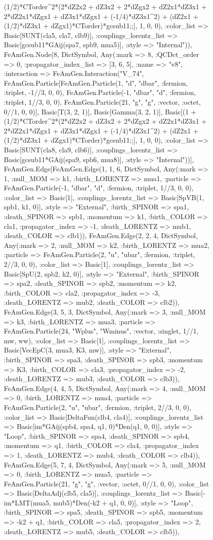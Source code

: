 \documentclass{revtex4}
\begin{document}
\begin{figure}[!htb]
\begin{center}
{(1/2)*CTorder^2*(2*dZ2x2 + dZ3x2 + 2*dZgx2 + dZ2x1*dZ3x1 + 2*dZ2x1*dZgx1 + dZ3x1*dZgx1 + (-1/4)*dZ3x1^2) + (dZ2x1 + (1/2)*dZ3x1 + dZgx1)*CTorder)*gcsub11;;], 1, 0, 0), :color_list => Basic[SUNT(cla5, cla7, clb9)], :couplings_lorentz_list => Basic[gcsub11*GAij(spa7, spb9, mua5)], :style => "Internal")), FeAmGen.Node(8, Dict{Symbol, Any}(:mark => 8, :QCDct_order => 0, :propagator_index_list => [3, 6, 5], :name => "v8", :interaction => FeAmGen.Interaction("V_74", FeAmGen.Particle[FeAmGen.Particle(1, "d", "dbar", :fermion, :triplet, -1//3, 0, 0), FeAmGen.Particle(-1, "dbar", "d", :fermion, :triplet, 1//3, 0, 0), FeAmGen.Particle(21, "g", "g", :vector, :octet, 0//1, 0, 0)], Basic[T(3, 2, 1)], Basic[Gamma(3, 2, 1)], Basic[(1 + (1/2)*CTorder^2*(2*dZ2x2 + dZ3x2 + 2*dZgx2 + dZ2x1*dZ3x1 + 2*dZ2x1*dZgx1 + dZ3x1*dZgx1 + (-1/4)*dZ3x1^2) + (dZ2x1 + (1/2)*dZ3x1 + dZgx1)*CTorder)*gcsub11;;], 1, 0, 0), :color_list => Basic[SUNT(cla8, cla9, clb6)], :couplings_lorentz_list => Basic[gcsub11*GAij(spa9, spb6, mua8)], :style => "Internal"))], FeAmGen.Edge[FeAmGen.Edge(1, 1, 6, Dict{Symbol, Any}(:mark => 1, :null_MOM => k1, :birth_LORENTZ => mua1, :particle => FeAmGen.Particle(-1, "dbar", "d", :fermion, :triplet, 1//3, 0, 0), :color_list => Basic[1], :couplings_lorentz_list => Basic[SpVB(1, spb1, k1, 0)], :style => "External", :birth_SPINOR => spa1, :death_SPINOR => spb1, :momentum => k1, :birth_COLOR => cla1, :propagator_index => -1, :death_LORENTZ => mub1, :death_COLOR => clb1)), FeAmGen.Edge(2, 2, 4, Dict{Symbol, Any}(:mark => 2, :null_MOM => k2, :birth_LORENTZ => mua2, :particle => FeAmGen.Particle(2, "u", "ubar", :fermion, :triplet, 2//3, 0, 0), :color_list => Basic[1], :couplings_lorentz_list => Basic[SpU(2, spb2, k2, 0)], :style => "External", :birth_SPINOR => spa2, :death_SPINOR => spb2, :momentum => k2, :birth_COLOR => cla2, :propagator_index => -3, :death_LORENTZ => mub2, :death_COLOR => clb2)), FeAmGen.Edge(3, 5, 3, Dict{Symbol, Any}(:mark => 3, :null_MOM => k3, :birth_LORENTZ => mua3, :particle => FeAmGen.Particle(24, "Wplus", "Wminus", :vector, :singlet, 1//1, mw, ww), :color_list => Basic[1], :couplings_lorentz_list => Basic[VecEpC(3, mua3, K3, mw)], :style => "External", :birth_SPINOR => spa3, :death_SPINOR => spb3, :momentum => K3, :birth_COLOR => cla3, :propagator_index => -2, :death_LORENTZ => mub3, :death_COLOR => clb3)), FeAmGen.Edge(4, 4, 5, Dict{Symbol, Any}(:mark => 4, :null_MOM => 0, :birth_LORENTZ => mua4, :particle => FeAmGen.Particle(2, "u", "ubar", :fermion, :triplet, 2//3, 0, 0), :color_list => Basic[DeltaFun(clb4, cla4)], :couplings_lorentz_list => Basic[im*GAij(spb4, spa4, q1, 0)*Den(q1, 0, 0)], :style => "Loop", :birth_SPINOR => spa4, :death_SPINOR => spb4, :momentum => q1, :birth_COLOR => cla4, :propagator_index => 1, :death_LORENTZ => mub4, :death_COLOR => clb4)), FeAmGen.Edge(5, 7, 4, Dict{Symbol, Any}(:mark => 5, :null_MOM => 0, :birth_LORENTZ => mua5, :particle => FeAmGen.Particle(21, "g", "g", :vector, :octet, 0//1, 0, 0), :color_list => Basic[DeltaAdj(clb5, cla5)], :couplings_lorentz_list => Basic[-im*LMT(mua5, mub5)*Den(-k2 + q1, 0, 0)], :style => "Loop", :birth_SPINOR => spa5, :death_SPINOR => spb5, :momentum => -k2 + q1, :birth_COLOR => cla5, :propagator_index => 2, :death_LORENTZ => mub5, :death_COLOR => clb5)), }
\end{center}
\end{figure}
\end{document}
